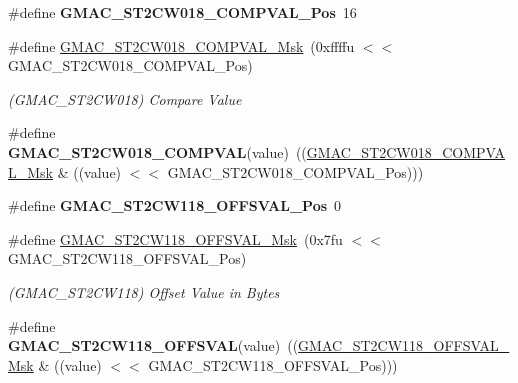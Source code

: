\begin{DoxyCompactItemize}
\item 
\mbox{\label{group__SAMV71__GMAC_gac76d7795e2c40ac2c9f6c000e883be1a}} 
\#define {\bfseries G\+M\+A\+C\+\_\+\+S\+T2\+C\+W018\+\_\+\+C\+O\+M\+P\+V\+A\+L\+\_\+\+Pos}~16
\item 
\mbox{\label{group__SAMV71__GMAC_gac6daf367bc315b3a480e977d305224af}} 
\#define \mbox{\hyperlink{group__SAMV71__GMAC_gac6daf367bc315b3a480e977d305224af}{G\+M\+A\+C\+\_\+\+S\+T2\+C\+W018\+\_\+\+C\+O\+M\+P\+V\+A\+L\+\_\+\+Msk}}~(0xffffu $<$$<$ G\+M\+A\+C\+\_\+\+S\+T2\+C\+W018\+\_\+\+C\+O\+M\+P\+V\+A\+L\+\_\+\+Pos)
\begin{DoxyCompactList}\small\item\em (G\+M\+A\+C\+\_\+\+S\+T2\+C\+W018) Compare Value \end{DoxyCompactList}\item 
\mbox{\label{group__SAMV71__GMAC_gaaa3c95b6a11000b60e96f44e9227b696}} 
\#define {\bfseries G\+M\+A\+C\+\_\+\+S\+T2\+C\+W018\+\_\+\+C\+O\+M\+P\+V\+AL}(value)~((\mbox{\hyperlink{group__SAMV71__GMAC_gac6daf367bc315b3a480e977d305224af}{G\+M\+A\+C\+\_\+\+S\+T2\+C\+W018\+\_\+\+C\+O\+M\+P\+V\+A\+L\+\_\+\+Msk}} \& ((value) $<$$<$ G\+M\+A\+C\+\_\+\+S\+T2\+C\+W018\+\_\+\+C\+O\+M\+P\+V\+A\+L\+\_\+\+Pos)))
\item 
\mbox{\label{group__SAMV71__GMAC_ga06a7c4b8046a08b969a75fe42982918c}} 
\#define {\bfseries G\+M\+A\+C\+\_\+\+S\+T2\+C\+W118\+\_\+\+O\+F\+F\+S\+V\+A\+L\+\_\+\+Pos}~0
\item 
\mbox{\label{group__SAMV71__GMAC_gaa05ecdd83b5db4eec29622cf077a1deb}} 
\#define \mbox{\hyperlink{group__SAMV71__GMAC_gaa05ecdd83b5db4eec29622cf077a1deb}{G\+M\+A\+C\+\_\+\+S\+T2\+C\+W118\+\_\+\+O\+F\+F\+S\+V\+A\+L\+\_\+\+Msk}}~(0x7fu $<$$<$ G\+M\+A\+C\+\_\+\+S\+T2\+C\+W118\+\_\+\+O\+F\+F\+S\+V\+A\+L\+\_\+\+Pos)
\begin{DoxyCompactList}\small\item\em (G\+M\+A\+C\+\_\+\+S\+T2\+C\+W118) Offset Value in Bytes \end{DoxyCompactList}\item 
\mbox{\label{group__SAMV71__GMAC_ga610b3c8d3d29652e44882c9ee6f3c7b6}} 
\#define {\bfseries G\+M\+A\+C\+\_\+\+S\+T2\+C\+W118\+\_\+\+O\+F\+F\+S\+V\+AL}(value)~((\mbox{\hyperlink{group__SAMV71__GMAC_gaa05ecdd83b5db4eec29622cf077a1deb}{G\+M\+A\+C\+\_\+\+S\+T2\+C\+W118\+\_\+\+O\+F\+F\+S\+V\+A\+L\+\_\+\+Msk}} \& ((value) $<$$<$ G\+M\+A\+C\+\_\+\+S\+T2\+C\+W118\+\_\+\+O\+F\+F\+S\+V\+A\+L\+\_\+\+Pos)))

\end{DoxyCompactItemize}
